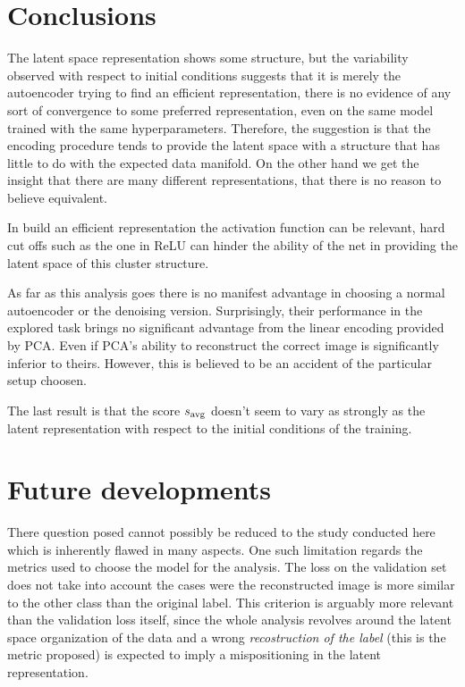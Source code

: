 \documentclass[twocolumn,gsifonts,twoside]{gsipaper}
\begin{document}
\section{Conclusions}
The latent space representation shows some structure, but the variability observed with respect to initial conditions suggests that it is merely the autoencoder trying to find an efficient representation, there is no evidence of any sort of convergence to some preferred representation, even on the same model trained with the same hyperparameters. Therefore, the suggestion is that the encoding procedure tends to provide the latent space with a structure that has little to do with the expected data manifold. On the other hand we get the insight that there are many different representations, that there is no reason to believe equivalent. 

In build an efficient representation the activation function can be relevant, hard cut offs such as the one in ReLU can hinder the ability of the net in providing the latent space of this cluster structure. 

As far as this analysis goes there is no manifest advantage in choosing a normal autoencoder or the denoising version. Surprisingly, their performance in the explored task brings no significant advantage from the linear encoding provided by PCA. Even if PCA's ability to reconstruct the correct image is significantly inferior to theirs. However, this is believed to be an accident of the particular setup choosen.

The last result is that the score $s_\textup{avg}$ doesn't seem to vary as strongly as the latent representation with respect to the initial conditions of the training.

\section{Future developments}
There question posed cannot possibly be reduced to the study conducted here which is inherently flawed in many aspects. One such limitation regards the metrics used to choose the model for the analysis. The loss on the validation set does not take into account the cases were the reconstructed image is more similar to the other class than the original label. This criterion is arguably more relevant than the validation loss itself, since the whole analysis revolves around the latent space organization of the data and a wrong \emph{recostruction of the label} (this is the metric proposed) is expected to imply a mispositioning in the latent representation.
\end{document}
